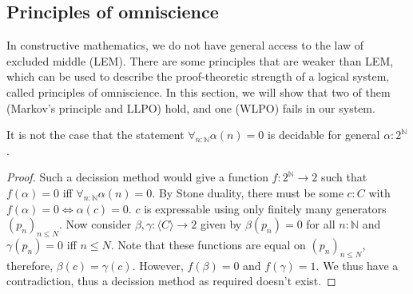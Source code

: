 \subsection{Principles of omniscience}
In constructive mathematics, we do not have general access to the law of excluded middle (LEM).
There are some principles that are weaker than LEM, which can be used to describe 
the proof-theoretic strength of a logical system, called principles of omniscience.
In this section, we will show that two of them (Markov's principle and LLPO) hold, 
and one (WLPO) fails in our system.

\begin{theorem}
  It is not the case that the statement %
  $\forall_{n:\mathbb N} \alpha(n) = 0$ is decidable for general $\alpha:2^\mathbb N$. 
\end{theorem}
\begin{proof}
  Such a decission method would give a function $f:2^\mathbb N \to 2$ such that 
  $f(\alpha) = 0$ iff $\forall_{n:\mathbb N} \alpha (n)= 0$. 
  By Stone duality, there must be some $c:C$ with 
  $f(\alpha) = 0 \iff \alpha(c) = 0$. 
  $c$ is expressable using only finitely many generators $(p_n)_{n\leq N}$. 
  Now consider $\beta,\gamma:\langle C \rangle \to 2$ given by $\beta(p_n) = 0$ for all $n:\mathbb N$ and
  $\gamma(p_n) = 0$ iff $n\leq N$. 
  Note that these functions are equal on $(p_n)_{n\leq N}$, therefore, $\beta(c) = \gamma(c)$. 
  However, $f(\beta) = 0$ and $f(\gamma) = 1$.
  We thus have a contradiction, thus a decission method as required doesn't exist. 
\end{proof}

